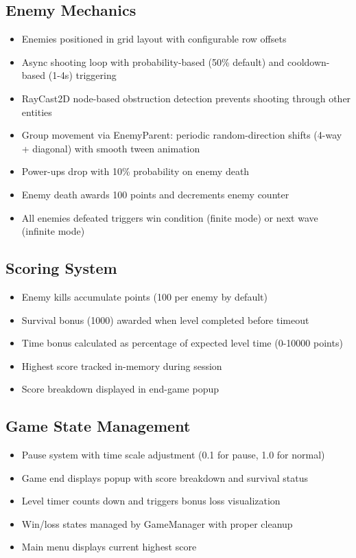\documentclass{article}
\begin{document}
\subsection{Enemy Mechanics}
\begin{itemize}
    \item Enemies positioned in grid layout with configurable row offsets
    \item Async shooting loop with probability-based (50\% default) and cooldown-based (1-4s) triggering
    \item RayCast2D node-based obstruction detection prevents shooting through other entities
    \item Group movement via EnemyParent: periodic random-direction shifts (4-way + diagonal) with smooth tween animation
    \item Power-ups drop with 10\% probability on enemy death
    \item Enemy death awards 100 points and decrements enemy counter
    \item All enemies defeated triggers win condition (finite mode) or next wave (infinite mode)
\end{itemize}

\subsection{Scoring System}
\begin{itemize}
    \item Enemy kills accumulate points (100 per enemy by default)
    \item Survival bonus (1000) awarded when level completed before timeout
    \item Time bonus calculated as percentage of expected level time (0-10000 points)
    \item Highest score tracked in-memory during session
    \item Score breakdown displayed in end-game popup
\end{itemize}

\subsection{Game State Management}
\begin{itemize}
    \item Pause system with time scale adjustment (0.1 for pause, 1.0 for normal)
    \item Game end displays popup with score breakdown and survival status
    \item Level timer counts down and triggers bonus loss visualization
    \item Win/loss states managed by GameManager with proper cleanup
    \item Main menu displays current highest score
\end{itemize}
\end{document}
